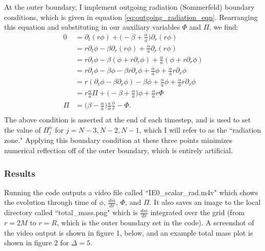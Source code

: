 \documentclass[12pt]{article}
\numberwithin{equation}{section}
\begin{document}
At the outer boundary, I implement outgoing radiation (Sommerfeld) boundary conditions, which is given in equation \ref{eq:outgoing_radiation_eqn}.  Rearranging this equation and substituting in our auxiliary variables $\Phi$ and $\Pi$, we find:
\begin{equation}
\begin{aligned}
0 &= \partial_t (r \phi) + \Big( -\beta + \frac{\alpha}{a} \Big) \partial_r (r \phi) \\
&= r \partial_t \phi - \beta \partial_r (r \phi) + \frac{\alpha}{a} \partial_r (r \phi) \\
&= r \partial_t \phi - \beta (\phi + r \partial_r \phi) + \frac{\alpha}{a} (\phi + r \partial_r \phi) \\
&= r \partial_t \phi - \beta \phi - \beta r \partial_r \phi + \frac{\alpha}{a} \phi + \frac{\alpha}{a} r \partial_r \phi \\
&= r (\partial_t \phi - \beta \partial_r \phi) - \beta \phi + \frac{\alpha}{a} \phi + \frac{\alpha}{a} r \partial_r \phi \\
&= r \frac{\alpha}{a} \Pi + \Big( - \beta + \frac{\alpha}{a} \Big) \phi + \frac{\alpha}{a} r \Phi \\
\Pi &= \Big(\beta - \frac{\alpha}{a} \Big) \frac{a}{\alpha} \frac{\phi}{r} - \Phi. \\
\end{aligned}
\end{equation}
The above condition is asserted at the end of each timestep, and is used to set the value of $\Pi^{n}_{j}$ for $j = N-3, N-2, N-1$, which I will refer to as the ``radiation zone."  Applying this boundary condition at these three points minimizes numerical reflection off of the outer boundary, which is entirely artificial.

\subsubsection{Results}
Running the code outputs a video file called ``IE0\_scalar\_rad.m4v" which shows the evolution through time of $\phi$, $\frac{d m}{d r}$, $\Phi$, and $\Pi$.  It also saves an image to the local directory called ``total\_mass.png" which is $\frac{d m}{d r}$ integrated over the grid (from $r = 2 M$ to $r = R$, which is the outer boundary set in the code).  A screenshot of the video output is shown in figure 1, below, and an example total mass plot is shown in figure 2 for $\Delta = 5$.
\end{document}
